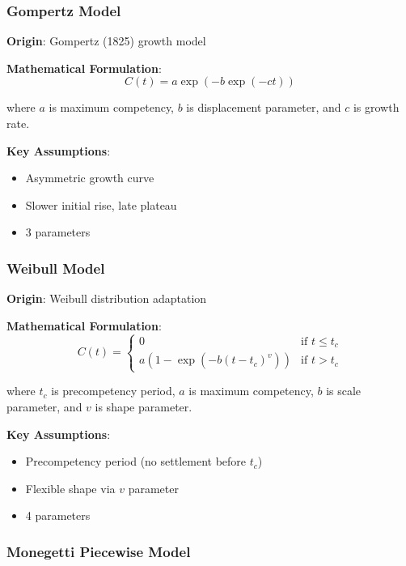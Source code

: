 \documentclass[11pt]{article}
\begin{document}
\subsubsection{Gompertz Model}

\textbf{Origin}: Gompertz (1825) growth model

\textbf{Mathematical Formulation}:
\begin{equation}
C(t) = a \exp(-b \exp(-c t))
\end{equation}

where $a$ is maximum competency, $b$ is displacement parameter, and $c$ is growth rate.

\textbf{Key Assumptions}:
\begin{itemize}
    \item Asymmetric growth curve
    \item Slower initial rise, late plateau
    \item 3 parameters
\end{itemize}

\subsubsection{Weibull Model}

\textbf{Origin}: Weibull distribution adaptation

\textbf{Mathematical Formulation}:
\begin{equation}
C(t) = \begin{cases}
0 & \text{if } t \leq t_c \\
a(1 - \exp(-b(t - t_c)^v)) & \text{if } t > t_c
\end{cases}
\end{equation}

where $t_c$ is precompetency period, $a$ is maximum competency, $b$ is scale parameter, and $v$ is shape parameter.

\textbf{Key Assumptions}:
\begin{itemize}
    \item Precompetency period (no settlement before $t_c$)
    \item Flexible shape via $v$ parameter
    \item 4 parameters
\end{itemize}

\subsubsection{Monegetti Piecewise Model}
\end{document}
